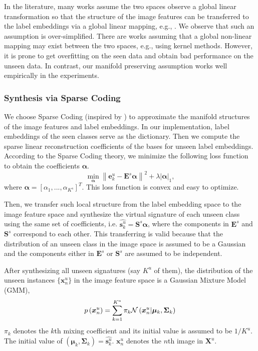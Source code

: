 \documentclass{article}
\begin{document}
In the literature, many works assume the two spaces observe a global linear transformation so that the structure of the image features can be transferred to the label embeddings via a global linear mapping, e.g., \cite{al2016recovering}\cite{qiao2016less}. We observe that such an assumption is over-simplified. There are works assuming that a global non-linear mapping may exist between the two spaces\cite{romera2015embarrassingly}, e.g., using kernel methods. However, it is prone to get overfitting on the seen data and obtain bad performance on the unseen data. In contrast, our manifold preserving assumption works well empirically in the experiments.

\subsubsection{Synthesis via Sparse Coding}
We choose Sparse Coding\cite{olshausen1997sparse} (inspired by \cite{wang2016relational}) to approximate the manifold structures of the image features and label embeddings. In our implementation, label embeddings of the seen classes serve as the dictionary. Then we compute the sparse linear reconstruction coefficients of the bases for unseen label embeddings.
According to the Sparse Coding theory, we minimize the following loss function to obtain the coefficients $\bm{\alpha}$.
\begin{equation}
\min_{\bm{\alpha} } \left \| \bm{e}^u_k -  \bm{E}^s\bm{\alpha} \right \|^2 + \lambda | \bm{\alpha} |_1,
\end{equation}
where $\bm{\alpha} = {[\alpha_1,...,\alpha_{K^s}]}^T $. This loss function is convex and easy to optimize.

Then, we transfer such local structure from the label embedding space to the image feature space and synthesize the virtual signature of each unseen class using the same set of coefficients, i.e. $  \widehat{\bm{s}^u_k} = \bm{S}^s \bm{\alpha}$, where the components in $\bm{E}^s$ and $\bm{S}^s$ correspond to each other. This transferring is valid because that the distribution of an unseen class in the image space is assumed to be a Gaussian and the components either in $\bm{E}^s$ or $\bm{S}^s$ are assumed to be independent.

After synthesizing all unseen signatures (say $K^u$ of them), the distribution of the unseen instances $\{\bm{x}^u_n\}$ in the image feature space is a Gaussian Mixture Model (GMM),
\begin{equation}
p\left( {\bm{x}^u_n} \right) = \sum\limits_{k = 1}^{K^u} {{\pi_k}{\cal N}\left( {\bm{x}^u_n|{\bm{\mu}_k},{\bm{\Sigma}_k}} \right)}
\label{equ:GMM}
\end{equation}
$\pi _k$ denotes the $k$th mixing coefficient and its initial value is assumed to be $1/K^u$. The initial value of $(\bm{\mu}_k,\bm{\Sigma}_k)=\widehat{\bm{s}^u_k}$. $\bm{x}^u_n$ denotes the $n$th image in $\bm{X}^u$.
\end{document}
